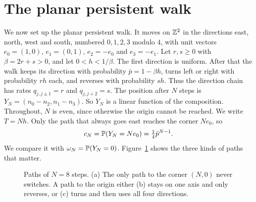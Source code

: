 \section{The planar persistent walk}\label{sec:planar}

We now set up the planar persistent walk. It moves on $\mathbb{Z}^2$ in the directions east, north, west and
south, numbered $0,1,2,3$ modulo $4$, with unit vectors $e_0=(1,0)$, $e_1=(0,1)$,
$e_2=-e_0$ and $e_3=-e_1$. Let $r,s\ge0$ with $\beta=2r+s>0$, and let
$0<h<1/\beta$. The first direction is uniform. After that the walk keeps its
direction with probability $\bar p=1-\beta h$, turns left or right with
probability $rh$ each, and reverses with probability $sh$. Thus the direction
chain has rates $q_{j,j\pm1}=r$ and $q_{j,j+2}=s$. The
position after $N$ steps is $Y_N=(n_0-n_2,n_1-n_3)$. So $Y_N$ is a linear
function of the composition. Throughout, $N$ is even, since otherwise the
origin cannot be reached. We write $T=Nh$. Only
the path that always goes east reaches the corner $Ne_0$, so
\[
 c_N=\mathbb{P}(Y_N=Ne_0)=\tfrac14\bar p^{N-1}.
\]
We compare it with $\omega_N=\mathbb{P}(Y_N=0)$. Figure~\ref{fig:planarpaths} shows the
three kinds of paths that matter.

\begin{figure}[t]
\centering
{}
\caption{Paths of $N=8$ steps. (a) The only path to the corner $(N,0)$ never
switches. A path to the origin either (b) stays on one axis and only reverses,
or (c) turns and then uses all four directions.}
\label{fig:planarpaths}
\end{figure}

